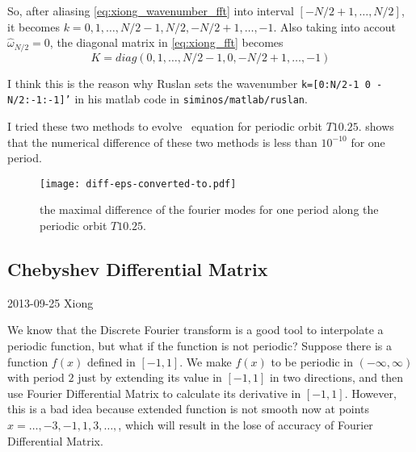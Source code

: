 \begin{itemize}
 So, after aliasing \eqref{eq:xiong_wavenumber_fft} into interval $[-N/2+1,\dots,N/2]$,
 it becomes $k=0,1,\dots , N/2-1, N/2, -N/2+1,\dots, -1$. Also taking into accout
 $\hat{\omega}_{N/2}=0$, the diagonal matrix in \eqref{eq:xiong_fft} becomes
   \begin{equation}
  \label{eq:xiong_wavenumber_fft_matlab}
  K=diag(0,1,\dots, N/2-1, 0, -N/2+1,\dots, -1)
 \end{equation}

 I think this is the reason why Ruslan sets the wavenumber \texttt{k=[0:N/2-1 0 -N/2:-1:-1]'}
 in his matlab code in \texttt{siminos/matlab/ruslan}.

 \end{itemize}

 I tried these two methods to
 evolve \KS\ equation for periodic orbit $T10.25$.  shows that
 the numerical difference of these two methods is less than $10^{-10}$ for one period.

 \begin{figure}[h]
 \centering
 \texttt{[image: diff-eps-converted-to.pdf]}
 \caption{the maximal difference of the fourier modes for one period along the periodic orbit
  $T10.25$.}
 \label{fig:xiong_sdmfft_dif}
\end{figure}

\clearpage

\subsection{Chebyshev Differential Matrix }
\begin{description}
\item[2013-09-25 Xiong]
\end{description}

We know that the Discrete Fourier transform is a good tool to interpolate a periodic function,
 but what if the function is not periodic? Suppose there is a function $f(x)$ defined in $[-1,1]$.
 We make $f(x)$ to be periodic in
 $(-\infty, \infty)$ with period $2$ just by extending its value in $[-1,1]$ in two directions, and
 then use Fourier Differential Matrix to calculate its derivative in $[-1,1]$. However,
 this is a bad idea
 because extended function is not smooth now at points $x=\dots, -3,-1,1,3,\dots,$, which will result
 in the lose of accuracy of Fourier Differential Matrix.


